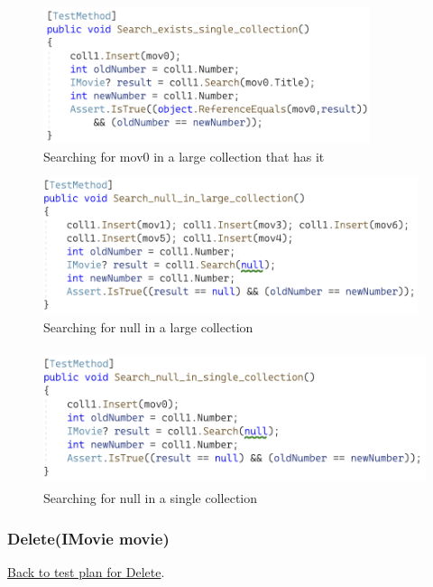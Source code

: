 \documentclass[a4paper]{article}
\begin{document}
\begin{figure}[H]
    \includegraphics[height=4cm]{data/Search_exists_single_collection.png}
    \caption{Searching for mov0 in a large collection that has it}
\end{figure}
\begin{figure}[H]
    \includegraphics[height=4cm]{data/Search_null_in_large_collection.png}
    \caption{Searching for null in a large collection}
\end{figure}
\begin{figure}[H]
    \includegraphics[height=4cm]{data/Search_null_in_single_collection.png}
    \caption{Searching for null in a single collection}
\end{figure}
\pagebreak

\subsubsection{Delete{(IMovie movie)}}
\hyperlink{subsubsection.3.2.5}{Back to test plan for Delete}.
\end{document}
